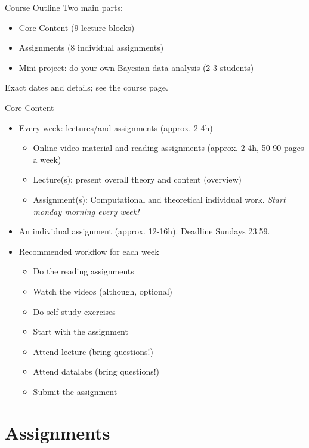 \documentclass[10pt,handout]{beamer}
\begin{document}
\begin{frame}{Course Outline}
Two main parts:
\begin{itemize}
\item Core Content (9 lecture blocks)\pause
\item Assignments (8 individual assignments)\pause
\item Mini-project: do your own Bayesian data analysis (2-3 students)\pause
\end{itemize}
Exact dates and details; see the course page.
\end{frame}

\begin{frame}{Core Content}

\begin{itemize}
\item Every week: lectures/and assignments (approx. 2-4h)
\begin{itemize}
\item Online video material and reading assignments (approx. 2-4h, 50-90 pages a week)
\item Lecture(s): present overall theory and content (overview)
\item Assignment(s): Computational and theoretical individual work. \emph{Start monday morning every week!}
\end{itemize}
\item An individual assignment (approx. 12-16h). Deadline Sundays 23.59.\pause
\item Recommended workflow for each week
\begin{itemize}
\item Do the reading assignments
\item Watch the videos (although, optional)
\item Do self-study exercises
\item Start with the assignment
\item Attend lecture (bring questions!)
\item Attend datalabs (bring questions!)
\item Submit the assignment
\end{itemize}
\end{itemize}

\end{frame}

\section{Assignments}
\frame{\sectionpage}
\end{document}
